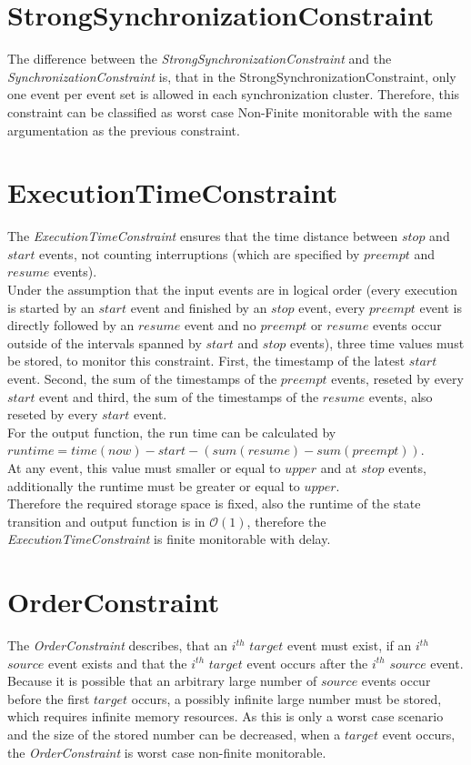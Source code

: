 	
\section{StrongSynchronizationConstraint}
	The difference between the \emph{StrongSynchronizationConstraint} and the \emph{SynchronizationConstraint} is, that in the StrongSynchronizationConstraint, only one event per event set is allowed in each synchronization cluster. Therefore, this constraint can be classified as worst case Non-Finite monitorable with the same argumentation as the previous constraint.
	
	
\section{ExecutionTimeConstraint}
	The \emph{ExecutionTimeConstraint} ensures that the time distance between $stop$ and $start$ events, not counting interruptions (which are specified by $preempt$ and $resume$ events).\\
	Under the assumption that the input events are in logical order (every execution is started by an $start$ event and finished by an $stop$ event, every $preempt$ event is directly followed by an $resume$ event and no $preempt$ or $resume$ events occur outside of the intervals spanned by $start$ and $stop$ events), three time values must be stored, to monitor this constraint. First, the timestamp of the latest $start$ event. Second, the sum of the timestamps of the $preempt$ events, reseted by every $start$ event and third, the sum of the timestamps of the $resume$ events, also reseted by every $start$ event.\\
	For the output function, the run time can be calculated by\\ $runtime = time(now) - start - (sum(resume)-sum(preempt))$.\\ At any event, this value must smaller or equal to $upper$ and at $stop$ events, additionally the runtime must be greater or equal to $upper$. \\
	Therefore the required storage space is fixed, also the runtime of the state transition and output function is in $\mathcal{O}(1)$, therefore the \emph{ExecutionTimeConstraint} is finite monitorable with delay.


\section{OrderConstraint}
	The \emph{OrderConstraint} describes, that an $i^{th}$ $target$ event must exist, if an $i^{th}$ $source$ event exists and that the $i^{th}$ $target$ event occurs after the $i^{th}$ $source$ event. Because it is possible that an arbitrary large number of $source$ events occur before the first $target$ occurs, a possibly infinite large number must be stored, which requires infinite memory resources. As this is only a worst case scenario and the size of the stored number can be decreased, when a $target$ event occurs, the \emph{OrderConstraint} is worst case non-finite monitorable.
	
